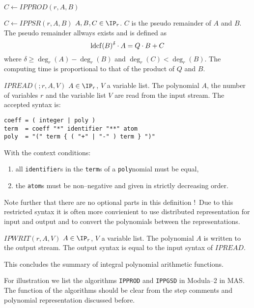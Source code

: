 \begin{deflist}{$C \gets IPPROD(r,A,B)$}
\item[$C \gets IPPSR(r,A,B)$] $A, B, C \in \IP_r$.
     $C$ is the pseudo remainder of $A$ and $B$.
     The pseudo remainder allways exists and is defined as 
     $${\rm ldcf}(B)^{\delta} \cdot A = Q \cdot B + C$$
     where $\delta \geq \deg_r(A) - \deg_r(B)$ and
     $\deg_r(C) < \deg_r(B)$.
     The computing time is proportional to 
     that of the product of $Q$ and $B$. 
\item[$IPREAD(;r,A,V)$] $A \in \IP_r$, $V$ a variable list. 
     The polynomial $A$, the number of variables $r$ and the 
     variable list $V$ are read from the input stream.
     The accepted syntax is:
     \begin{verbatim}
coeff = ( integer | poly )
term  = coeff "*" identifier "**" atom
poly  = "(" term { ( "+" | "-" ) term } ")"  
     \end{verbatim}
     With the context conditions:
     \begin{enumerate}
     \item all \verb/identifier/s in the \verb/term/s 
           of a \verb/poly/nomial must be equal,
     \item the \verb/atom/s must be non--negative and given in 
           strictly decreasing order. 
     \end{enumerate}
     Note further that there are no optional parts 
     in this definition $!$\
     Due to this restricted syntax it is often 
     more convienient to use distributed representation 
     for input and output and to convert 
     the polynomials between the representations.
\item[$IPWRIT(r,A,V)$] $A \in \IP_r$, $V$ a variable list. 
     The polynomial $A$ is written to the output stream.
     The output syntax is equal to the input syntax 
     of $IPREAD$. 
\end{deflist}
This concludes the summary of 
integral polynomial arithmetic functions.


For illustration we list 
the algorithms \verb/IPPROD/ and \verb/IPPGSD/ in Modula--2
in MAS.
The function of the algorithms should be clear from the 
step comments and polynomial representation 
discussed before.

